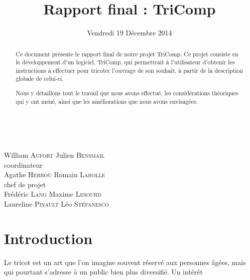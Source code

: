 \documentclass{article}
\title{Rapport final : TriComp}
\author{}
\date{Vendredi 19 Décembre 2014}
\begin{document}

\makeatletter %
  \begin{titlepage}
    \begin{center}
       {\LARGE \@title} \\
       \vspace{2cm} {\large \@date}
       \vspace{3cm}
    \end{center}
       {\large {William \textsc{Aufort} \hfill Julien
           \textsc{Bensmail} \\}
    \vspace{1cm} {\hfill coordinateur \\} {Agathe \textsc{Herrou}
      \hfill Romain \textsc{Labolle} \\}
       \vspace{1cm} {chef de projet \\}
       \vspace{1.5cm} {Frédéric \textsc{Lang} \hfill Maxime
         \textsc{Lesourd} \\} {Laureline \textsc{Pinault} \hfill Léo
         \textsc{Stéfanesco} \\}}
       \vspace{2.5cm}
    \begin{abstract}
Ce document présente le rapport final de notre projet TriComp. Ce projet consiste en le développement d'un logiciel, TriComp, 
qui permettrait à l'utilisateur d'obtenir les instructions à effectuer pour tricoter l'ouvrage de son souhait, à partir de la 
description globale de celui-ci.

Nous y détaillons tout le travail que nous avons effectué, les considérations théoriques qui y ont mené, ainsi que les améliorations 
que nous avons envisagées.
    \end{abstract}
  \end{titlepage}
\makeatother

\newpage

\tableofcontents

\newpage

\section*{Introduction}

Le tricot est un art que l'on imagine souvent réservé aux personnes
âgées, mais qui pourtant s'adresse à un public bien plus diversifié. 
Un intérêt 
\end{document}
